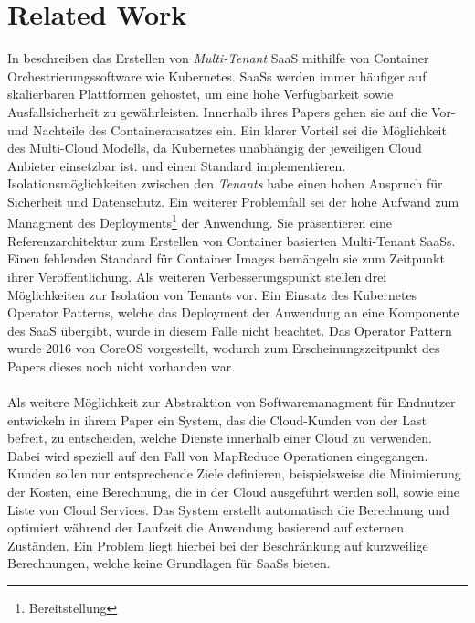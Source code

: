 \section{Related Work}
\label{sec:fazit_ausblick:related_work}

In\cite{Truyen2016} beschreiben \citeauthor{Truyen2016}
das Erstellen von \emph{Multi-Tenant}
\acf{SaaS} mithilfe von Container Orchestrierungssoftware wie Kubernetes.
\acp{SaaS} werden immer häufiger auf skalierbaren Plattformen gehostet, um eine hohe Verfügbarkeit sowie Ausfallsicherheit zu gewährleisten.
Innerhalb ihres Papers gehen sie auf die Vor- und Nachteile des Containeransatzes ein.
Ein klarer Vorteil sei die Möglichkeit des Multi-Cloud Modells, da Kubernetes unabhängig der jeweiligen Cloud Anbieter einsetzbar ist.
und einen Standard implementieren.
Isolationsmöglichkeiten zwischen den \emph{Tenants} habe einen hohen Anspruch für Sicherheit und Datenschutz.
Ein weiterer Problemfall sei der hohe Aufwand zum Managment des Deployments\footnote{Bereitstellung} der Anwendung.
Sie präsentieren eine Referenzarchitektur zum Erstellen von Container basierten Multi-Tenant SaaSs.
Einen fehlenden Standard für Container Images bemängeln sie zum Zeitpunkt ihrer Veröffentlichung.
Als weiteren Verbesserungspunkt stellen \citeauthor{Truyen2016} drei Möglichkeiten zur Isolation von Tenants vor.
Ein Einsatz des Kubernetes Operator Patterns, welche das Deployment der Anwendung an eine Komponente des \acf{SaaS} übergibt,
wurde in diesem Falle nicht beachtet. Das Operator Pattern wurde 2016 von CoreOS vorgestellt, wodurch zum Erscheinungszeitpunkt
des Papers dieses noch nicht vorhanden war.

\paragraph{}
Als weitere Möglichkeit zur Abstraktion von Softwaremanagment für Endnutzer entwickeln \citeauthor{Wieder2012} in ihrem Paper
\cite{Wieder2012} ein System, das die Cloud-Kunden von der Last befreit, zu entscheiden, welche Dienste innerhalb einer Cloud zu verwenden.
Dabei wird speziell auf den Fall von MapReduce Operationen eingegangen. Kunden sollen nur entsprechende Ziele definieren, beispielsweise
die Minimierung der Kosten, eine Berechnung, die in der Cloud ausgeführt werden soll, sowie eine Liste von Cloud Services.
Das System erstellt automatisch die Berechnung und optimiert während der Laufzeit die Anwendung basierend auf externen Zuständen.
Ein Problem liegt hierbei bei der Beschränkung auf kurzweilige Berechnungen, welche keine Grundlagen für \acp{SaaS} bieten.

